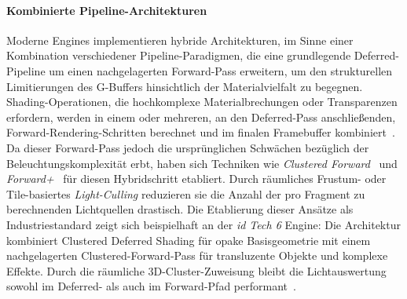 \paragraph{Kombinierte Pipeline-Architekturen}
Moderne Engines implementieren hybride Architekturen, im Sinne einer Kombination verschiedener Pipeline-Paradigmen,
die eine grundlegende Deferred-Pipeline um einen nachgelagerten Forward-Pass erweitern, um den strukturellen
Limitierungen des \ac{G-Buffer}s hinsichtlich der Materialvielfalt zu begegnen.
Shading-Operationen, die hochkomplexe Materialbrechungen oder Transparenzen erfordern, werden in einem oder mehreren, an
den Deferred-Pass anschließenden, Forward-Rendering-Schritten berechnet und im finalen Framebuffer
kombiniert~\parencite[vgl.][S.~887]{akenine-mollerRealtimeRendering2019}.
Da dieser Forward-Pass jedoch die ursprünglichen Schwächen bezüglich der Beleuchtungskomplexität erbt, haben sich
Techniken wie \textit{Clustered Forward}~\parencite[vgl.][]{olssonClusteredDeferredForward2012} und
\textit{Forward+}~\parencite[vgl.][]{haradaForwardBringingDeferred2012} für diesen Hybridschritt etabliert.
Durch räumliches Frustum- oder Tile-basiertes \textit{Light-Culling} reduzieren sie die Anzahl der pro Fragment zu
berechnenden Lichtquellen drastisch.
Die Etablierung dieser Ansätze als Industriestandard zeigt sich beispielhaft an der \textit{id Tech 6} Engine:
Die Architektur kombiniert Clustered Deferred Shading für opake Basisgeometrie mit einem nachgelagerten
Clustered-Forward-Pass für transluzente Objekte und komplexe Effekte.
Durch die räumliche 3D-Cluster-Zuweisung bleibt die Lichtauswertung sowohl im Deferred- als auch im Forward-Pfad
performant~\parencite[vgl.][]{DOOM}.


